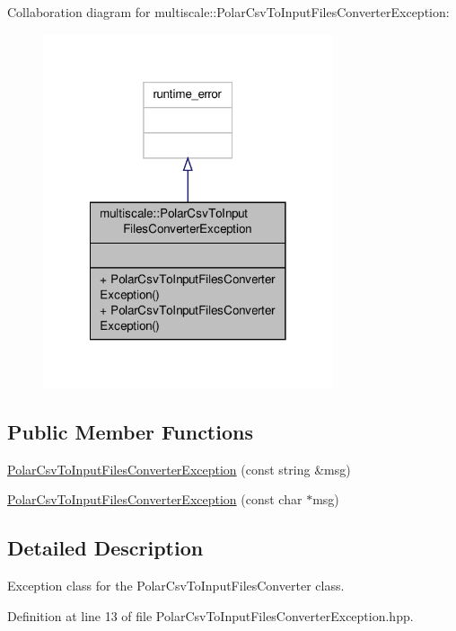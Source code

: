 Collaboration diagram for multiscale\-:\-:Polar\-Csv\-To\-Input\-Files\-Converter\-Exception\-:\nopagebreak
\begin{figure}[H]
\begin{center}
\leavevmode
\includegraphics[width=242pt]{classmultiscale_1_1PolarCsvToInputFilesConverterException__coll__graph}
\end{center}
\end{figure}
\subsection*{Public Member Functions}
\begin{DoxyCompactItemize}
\item 
\hyperlink{classmultiscale_1_1PolarCsvToInputFilesConverterException_a33edcdbd7f8786a855af3e1f4b21b8d1}{Polar\-Csv\-To\-Input\-Files\-Converter\-Exception} (const string \&msg)
\item 
\hyperlink{classmultiscale_1_1PolarCsvToInputFilesConverterException_a3f8dae9f6871643bbdbc2654eb32c87b}{Polar\-Csv\-To\-Input\-Files\-Converter\-Exception} (const char $\ast$msg)
\end{DoxyCompactItemize}


\subsection{Detailed Description}
Exception class for the Polar\-Csv\-To\-Input\-Files\-Converter class. 

Definition at line 13 of file Polar\-Csv\-To\-Input\-Files\-Converter\-Exception.\-hpp.



